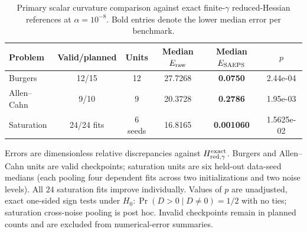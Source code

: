\begin{table}[!htbp]
\centering
\caption{Primary scalar curvature comparison against exact finite-$\gamma$ reduced-Hessian references at $\alpha=10^{-8}$. Bold entries denote the lower median error per benchmark.}
\label{tab:main_results}
\small
\setlength{\tabcolsep}{4pt}
\begin{tabular}{lcc S[table-format=2.4] S[table-format=1.6] S[table-format=1.4e-1,scientific-notation=true]}
\toprule
{Problem} & {Valid/planned} & {Units} & {Median $E_{\rm raw}$} & {Median $E_{\rm SAEPS}$} & {$p$} \\
\midrule
Burgers & 12/15 & 12 & 27.7268 & \bfseries 0.0750 & 2.44e-04 \\
Allen--Cahn & 9/10 & 9 & 20.3728 & \bfseries 0.2786 & 1.95e-03 \\
Saturation & 24/24 fits & 6 seeds & 16.8165 & \bfseries 0.001060 & 1.5625e-02 \\
\bottomrule
\end{tabular}
\par\vspace{3pt}\begin{minipage}{.98\linewidth}\footnotesize Errors are dimensionless relative discrepancies against $H_{\mathrm{red},\gamma}^{\mathrm{exact}}$. Burgers and Allen--Cahn units are valid checkpoints; saturation units are six held-out data-seed medians (each pooling four dependent fits across two initializations and two noise levels). All $24$ saturation fits improve individually. Values of $p$ are unadjusted, exact one-sided sign tests under $H_0:\Pr(D>0\mid D\ne0)=1/2$ with no ties; saturation cross-noise pooling is post hoc. Invalid checkpoints remain in planned counts and are excluded from numerical-error summaries.\end{minipage}
\end{table}
